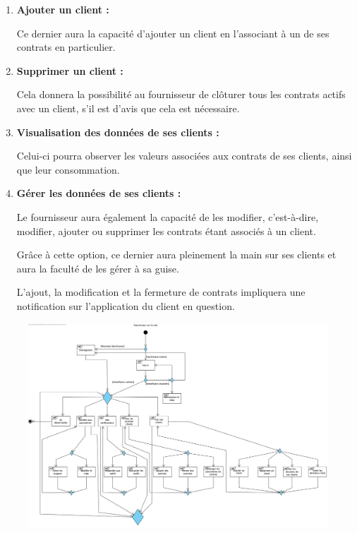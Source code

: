 \begin{enumerate}[-]

\item \textbf{Ajouter un client : }\newline

Ce dernier aura la capacité d’ajouter un client en l’associant à un de ses contrats en particulier.

\item \textbf{Supprimer un client :}\newline

Cela donnera la possibilité au fournisseur de clôturer tous les contrats actifs avec un client, s’il est d’avis que cela est nécessaire.

\item \textbf{Visualisation des données de ses clients :}\newline

Celui-ci pourra observer les valeurs associées aux contrats de ses clients, ainsi que leur consommation.

\item \textbf{Gérer les données de ses clients : }\newline

Le fournisseur aura également la capacité de les modifier, c’est-à-dire, modifier, ajouter ou supprimer les contrats étant associés à un client.\newline

Grâce à cette option, ce dernier aura pleinement la main sur ses clients et aura la faculté de les gérer à sa guise.\newline

L’ajout, la modification et la fermeture de contrats impliquera une notification sur l’application du client en question.

\end{enumerate}

\newpage

\begin{figure}[h]
\centering
\includegraphics[width = 1\textwidth]{Base/overview/img/overview-fournisseur.png}
\end{figure}